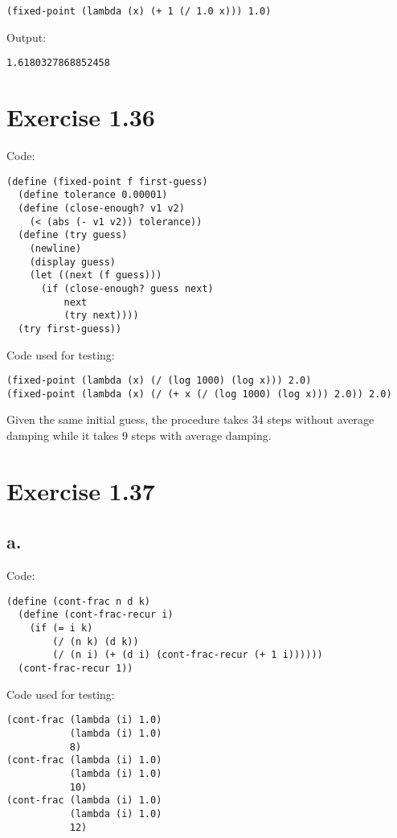 \documentclass[../main.tex]{subfiles}
\begin{document}
\begin{lstlisting}
(fixed-point (lambda (x) (+ 1 (/ 1.0 x))) 1.0)
\end{lstlisting}

Output:

\begin{lstlisting}
1.6180327868852458
\end{lstlisting}

\section{Exercise 1.36}

Code:

\begin{lstlisting}
(define (fixed-point f first-guess)
  (define tolerance 0.00001)
  (define (close-enough? v1 v2)
    (< (abs (- v1 v2)) tolerance))
  (define (try guess)
    (newline)
    (display guess)
    (let ((next (f guess)))
      (if (close-enough? guess next)
          next
          (try next))))
  (try first-guess))
\end{lstlisting}

Code used for testing:

\begin{lstlisting}
(fixed-point (lambda (x) (/ (log 1000) (log x))) 2.0)
(fixed-point (lambda (x) (/ (+ x (/ (log 1000) (log x))) 2.0)) 2.0)
\end{lstlisting}

Given the same initial guess, the procedure takes 34 steps without
 average damping while it takes 9 steps with average damping.

\section{Exercise 1.37}

\subsection*{a.}

Code:

\begin{lstlisting}
(define (cont-frac n d k)
  (define (cont-frac-recur i)
    (if (= i k)
        (/ (n k) (d k))
        (/ (n i) (+ (d i) (cont-frac-recur (+ 1 i))))))
  (cont-frac-recur 1))
\end{lstlisting}

Code used for testing:

\begin{lstlisting}
(cont-frac (lambda (i) 1.0)
           (lambda (i) 1.0)
           8)
(cont-frac (lambda (i) 1.0)
           (lambda (i) 1.0)
           10)
(cont-frac (lambda (i) 1.0)
           (lambda (i) 1.0)
           12)
\end{lstlisting}
\end{document}
